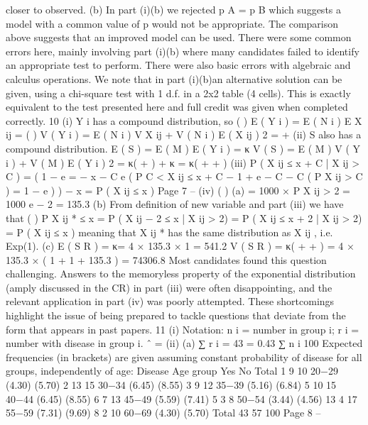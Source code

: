\documentclass[a4paper,12pt]{article}
\begin{document}
\begin{enumerate}
closer to observed.
(b)
In part (i)(b) we rejected p A = p B which suggests a model with a
common value of p would not be appropriate. The comparison above
suggests that an improved model can be used.
There were some common errors here, mainly involving part (i)(b) where many candidates
failed to identify an appropriate test to perform. There were also basic errors with algebraic
and calculus operations.
We note that in part (i)(b)an alternative solution can be given, using a chi-square test with
1 d.f. in a 2x2 table (4 cells). This is exactly equivalent to the test presented here and full
credit was given when completed correctly.
10
(i)
Y i has a compound distribution, so
( )
E ( Y i ) = E ( N i ) E X ij = \lambda\mu
( )
V ( Y i ) = E ( N i ) V X ij + V ( N i ) E ( X ij ) 2 = \lambda{} + \lambda{}
(ii)
S also has a compound distribution.
E ( S ) = E ( M ) E ( Y i ) = κ\lambda\mu
V ( S ) = E ( M ) V ( Y i ) + V ( M ) E ( Y i ) 2 = κ\lambda (  +  ) + κ  = κ\lambda (  +  + \lambda{} )
(iii)
P ( X ij ≤ x + C | X ij > C ) =
( 1 − e
=
− x − C
e
(
P C < X ij ≤ x + C
− 1 + e − C
− C
(
P X ij > C
) = 1 − e
)
)
− x
= P ( X ij ≤ x )
Page 7 – %
(iv)
(
)
(a) \lambda * = 1000 × P X ij > 2 = 1000 e − 2 = 135.3
(b) From definition of new variable and part (iii) we have that
(
)
P X ij * ≤ x = P ( X ij − 2 ≤ x | X ij > 2) = P ( X ij ≤ x + 2 | X ij > 2) = P ( X ij ≤ x )
meaning that X ij * has the same distribution as X ij , i.e. Exp(1).
(c)
E ( S R ) = κ\lambda * \mu = 4 × 135.3 × 1 = 541.2
V ( S R ) = κ\lambda * (  +  + \lambda *  ) = 4 × 135.3 × ( 1 + 1 + 135.3 ) = 74306.8
Most candidates found this question challenging. Answers to the memoryless property of the
exponential distribution (amply discussed in the CR) in part (iii) were often disappointing, and the relevant application in part (iv) was poorly attempted. These shortcomings highlight the issue of being prepared to tackle questions that deviate from the form that appears in
past papers.
11
(i)
Notation: n i = number in group i; r i = number with disease in group i.
\theta ˆ =
(ii)
(a)
∑ r i = 43 = 0.43
∑ n i 100
Expected frequencies (in brackets) are given assuming constant
probability of disease for all groups, independently of age:
Disease
Age group Yes
No
Total
1
9
10
20−29
(4.30) (5.70)
2
13
15
30−34
(6.45) (8.55)
3
9
12
35−39
(5.16) (6.84)
5
10
15
40−44
(6.45) (8.55)
6
7
13
45−49
(5.59) (7.41)
5
3
8
50−54
(3.44) (4.56)
13
4
17
55−59
(7.31) (9.69)
8
2
10
60−69
(4.30) (5.70)
Total
43
57
100
Page 8 – %

\end{enumerate}
\end{document}
